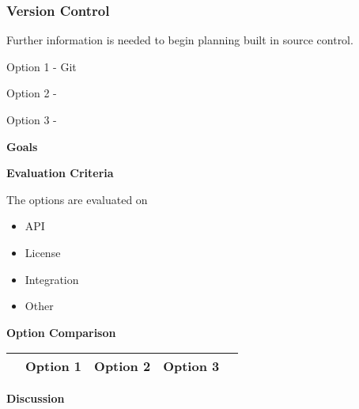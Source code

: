 \documentclass[letterpaper, 10pt, draftclsnofoot, compsoc, onecolumn]{IEEEtran}
\begin{document}
{%

\medskip

\newpage
\subsubsection{Version Control}
{\noindent Further information is needed to begin planning built in source control. \par}

{\noindent Option 1 - Git \par}
{\noindent \par}

\medskip
{\noindent Option 2 - \par}
{\noindent \par}

\medskip
{\noindent Option 3 - \par}
{\noindent \par}

\medskip
{\noindent\rmfamily\bfseries\color{black} Goals \par}
{\noindent \par}

\medskip
\newpage
{\noindent\rmfamily\bfseries\color{black} Evaluation Criteria \par}
{\noindent The options are evaluated on 

\begin{itemize}
\item API
\item License
\item Integration
\item Other
\end{itemize}

 \par}


\newpage
{\noindent\rmfamily\bfseries\color{black} Option Comparison \par}
\tablehead{}
\begin{supertabular}{|p{2cm}|p{2.5cm}|p{2.5cm}|p{2.5cm}|p{2.5cm}|}
\hline & Option 1 & Option 2 & Option 3\\ \hline
\end{supertabular}

\newpage
{\noindent\rmfamily\bfseries\color{black} Discussion \par}
{\noindent  \par}

}
\end{document}
